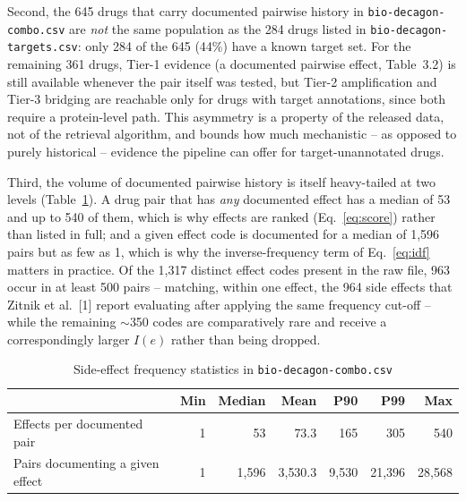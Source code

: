 Second, the 645 drugs that carry documented pairwise history in
\texttt{bio-decagon-combo.csv} are \emph{not} the same population as the 284
drugs listed in \texttt{bio-decagon-targets.csv}: only 284 of the 645 (44\%)
have a known target set. For the remaining 361 drugs, Tier-1 evidence (a
documented pairwise effect, Table~3.2) is still available whenever the pair
itself was tested, but Tier-2 amplification and Tier-3 bridging are
reachable only for drugs with target annotations, since both require a
protein-level path. This asymmetry is a property of the released data, not
of the retrieval algorithm, and bounds how much mechanistic -- as opposed to
purely historical -- evidence the pipeline can offer for target-unannotated
drugs.

Third, the volume of documented pairwise history is itself heavy-tailed at
two levels (Table~\ref{tab:effect-freq}). A drug pair that has \emph{any}
documented effect has a median of 53 and up to 540 of them, which is why
effects are ranked (Eq.~\eqref{eq:score}) rather than listed in full; and a
given effect code is documented for a median of 1{,}596 pairs but as few as
1, which is why the inverse-frequency term of Eq.~\eqref{eq:idf} matters in
practice. Of the 1{,}317 distinct effect codes present in the raw file, 963
occur in at least 500 pairs -- matching, within one effect, the 964 side
effects that Zitnik et al.~[1] report evaluating after applying the same
frequency cut-off -- while the remaining $\sim$350 codes are comparatively
rare and receive a correspondingly larger $I(e)$ rather than being dropped.

\begin{table}[t]
  \caption{Side-effect frequency statistics in \texttt{bio-decagon-combo.csv}}
  \label{tab:effect-freq}
  \centering
  \begin{tabular}{@{}lrrrrrr@{}}
    \toprule
     & Min & Median & Mean & P90 & P99 & Max \\
    \midrule
    Effects per documented pair      & 1 & 53      & 73.3    & 165   & 305    & 540 \\
    Pairs documenting a given effect & 1 & 1{,}596 & 3{,}530.3 & 9{,}530 & 21{,}396 & 28{,}568 \\
    \bottomrule
  \end{tabular}
\end{table}

